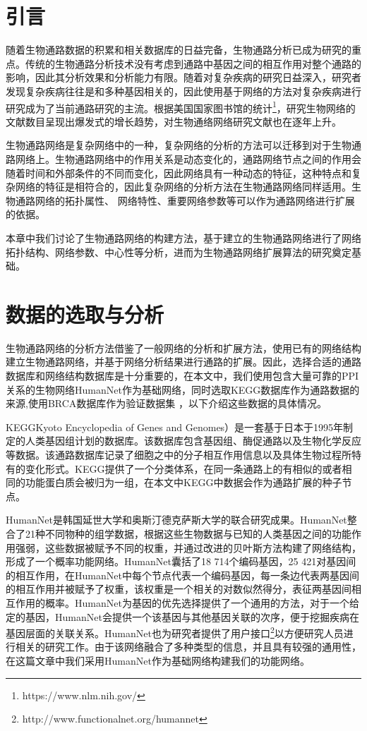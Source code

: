 \section{引言}
随着生物通路数据的积累和相关数据库的日益完备，生物通路分析已成为研究的重点。传统的生物通路分析技术没有考虑到通路中基因之间的相互作用对整个通路的影响，因此其分析效果和分析能力有限。随着对复杂疾病的研究日益深入，研究者发现复杂疾病往往是和多种基因相关的，因此使用基于网络的方法对复杂疾病进行研究成为了当前通路研究的主流。根据美国国家图书馆的统计\footnote{https://www.nlm.nih.gov/}，研究生物网络的文献数目呈现出爆发式的增长趋势，对生物通络网络研究文献也在逐年上升。

生物通路网络是复杂网络中的一种，复杂网络的分析的方法可以迁移到对于生物通路网络上。生物通路网络中的作用关系是动态变化的，通路网络节点之间的作用会随着时间和外部条件的不同而变化，因此网络具有一种动态的特征，这种特点和复杂网络的特征是相符合的，因此复杂网络的分析方法在生物通路网络同样适用。生物通路网络的拓扑属性、 网络特性、重要网络参数等可以作为通路网络进行扩展的依据。

本章中我们讨论了生物通路网络的构建方法，基于建立的生物通路网络进行了网络拓扑结构、网络参数、中心性等分析，进而为生物通路网络扩展算法的研究奠定基础。

\section{数据的选取与分析}
生物通路网络的分析方法借鉴了一般网络的分析和扩展方法，使用已有的网络结构建立生物通路网络，并基于网络分析结果进行通路的扩展。因此，选择合适的通路数据库和网络结构数据库是十分重要的，在本文中，我们使用包含大量可靠的PPI关系的生物网络HumanNet\cite{lee2011prioritizing}作为基础网络，同时选取KEGG\cite{kanehisa2008kegg}数据库作为通路数据的来源,使用BRCA数据库作为验证数据集 ，以下介绍这些数据的具体情况。

KEGG\cite{kanehisa2008kegg}Kyoto Encyclopedia of Genes and Genomes）是一套基于日本于1995年制定的人类基因组计划的数据库。该数据库包含基因组、酶促通路以及生物化学反应等数据。该通路数据库记录了细胞之中的分子相互作用信息以及具体生物过程所特有的变化形式。KEGG\cite{kanehisa2008kegg}提供了一个分类体系，在同一条通路上的有相似的或者相同的功能蛋白质会被归为一组，在本文中KEGG中数据会作为通路扩展的种子节点。

HumanNet\cite{lee2011prioritizing}是韩国延世大学和奥斯汀德克萨斯大学的联合研究成果。HumanNet\cite{lee2011prioritizing}整合了21种不同物种的组学数据，根据这些生物数据与已知的人类基因之间的功能作用强弱，这些数据被赋予不同的权重，并通过改进的贝叶斯方法构建了网络结构，形成了一个概率功能网络。HumanNet囊括了18 714个编码基因，25 421对基因间的相互作用，在HumanNet中每个节点代表一个编码基因，每一条边代表两基因间的相互作用并被赋予了权重，该权重是一个相关的对数似然得分，表征两基因间相互作用的概率。HumanNet为基因的优先选择提供了一个通用的方法，对于一个给定的基因，HumanNet会提供一个该基因与其他基因关联的次序，便于挖掘疾病在基因层面的关联关系。HumanNet也为研究者提供了用户接口\footnote{http://www.functionalnet.org/humannet}以方便研究人员进行相关的研究工作。由于该网络融合了多种类型的信息，并且具有较强的通用性，在这篇文章中我们采用HumanNet作为基础网络构建我们的功能网络。

